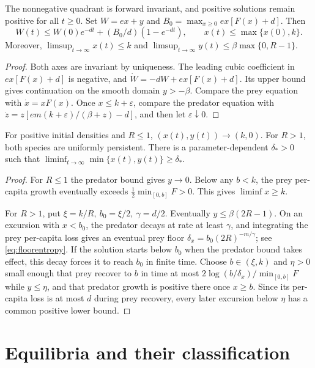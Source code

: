 \begin{theorem}\label{thm:bounds}
The nonnegative quadrant is forward invariant, and positive solutions remain positive for all \(t\ge0\). Set \(W=ex+y\) and \(B_0=\max_{x\ge0} ex[F(x)+d]\). Then
\[
 W(t)\le W(0)e^{-dt}+(B_0/d)(1-e^{-dt}),\qquad
 x(t)\le\max\{x(0),k\}.
\]
Moreover, \(\limsup_{t\to\infty}x(t)\le k\) and
\(\limsup_{t\to\infty}y(t)\le\beta\max\{0,R-1\}\).
\end{theorem}
\begin{proof}
Both axes are invariant by uniqueness. The leading cubic coefficient in \(ex[F(x)+d]\) is negative, and \(\dot W=-dW+ex[F(x)+d]\). Its upper bound gives continuation on the smooth domain \(y>-\beta\). Compare the prey equation with \(\dot x=xF(x)\). Once \(x\le k+\varepsilon\), compare the predator equation with \(\dot z=z[em(k+\varepsilon)/(\beta+z)-d]\), and then let \(\varepsilon\downarrow0\).
\end{proof}

\begin{theorem}\label{thm:per}
For positive initial densities and \(R\le1\), \((x(t),y(t))\to(k,0)\). For \(R>1\), both species are uniformly persistent. There is a parameter-dependent \(\delta_*>0\) such that \(\liminf_{t\to\infty}\min\{x(t),y(t)\}\ge\delta_*\).
\end{theorem}
\begin{proof}
For \(R\le1\) the predator bound gives \(y\to0\). Below any \(b<k\), the prey per-capita growth eventually exceeds \(\tfrac12\min_{[0,b]}F>0\). This gives \(\liminf x\ge k\).

For \(R>1\), put \(\xi=k/R,\ b_0=\xi/2,\ \gamma=d/2\). Eventually \(y\le\beta(2R-1)\). On an excursion with \(x<b_0\), the predator decays at rate at least \(\gamma\), and integrating the prey per-capita loss gives an eventual prey floor \(\delta_x=b_0(2R)^{-m/\gamma}\); see \eqref{eq:floorentropy}. If the solution starts below \(b_0\) when the predator bound takes effect, this decay forces it to reach \(b_0\) in finite time. Choose \(b\in(\xi,k)\) and \(\eta>0\) small enough that prey recover to \(b\) in time at most \(2\log(b/\delta_x)/\min_{[0,b]}F\) while \(y\le\eta\), and that predator growth is positive there once \(x\ge b\). Since its per-capita loss is at most \(d\) during prey recovery, every later excursion below \(\eta\) has a common positive lower bound.
\end{proof}

\section{Equilibria and their classification}\label{sec:eq}

